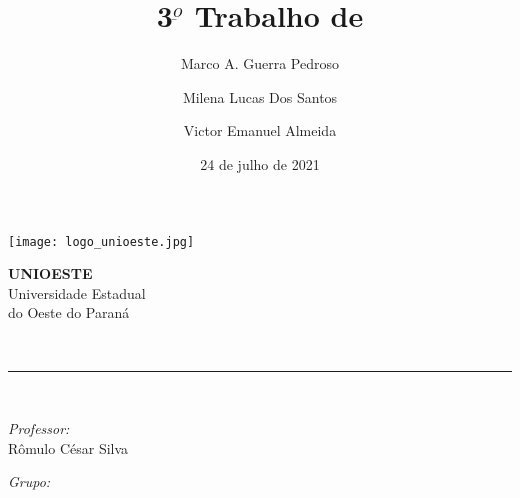 \documentclass[12pt, a4paper]{article}
\author{Marco A. Guerra Pedroso\and Milena Lucas Dos Santos\and Victor Emanuel Almeida}
\title{3$^{\underbar{o}}$ Trabalho de \materia}
\date{24 de julho de 2021}
\newcommand{\prof}{Rômulo César Silva}
\begin{document}
\begin{titlepage}
    \centering
    \thispagestyle{fancy}

    \begin{minipage}{0.4\textwidth}
        \begin{flushleft}
            \texttt{[image: logo\_unioeste.jpg]}\\[1.0 cm]
        \end{flushleft}
    \end{minipage}
    \begin{minipage}{0.5\textwidth}
        \begin{flushright}\large
            \textsc{\LARGE\textbf{UNIOESTE}}\\
            \vspace{1cm}
            Universidade Estadual\\do Oeste do Paraná
        \end{flushright}
    \end{minipage}
    \vspace*{4.5 cm}

    {\huge\bfseries\thetitle}\\
    \rule{\linewidth}{0.2 mm}\\[1.5 cm]

    \vspace{2cm}
    \begin{minipage}[t]{0.4\textwidth}
        \begin{flushleft}\large
            \emph{Professor:}\\
            \prof\\
        \end{flushleft}
    \end{minipage}
    \begin{minipage}[t]{0.5\textwidth}

        \begin{flushright}\large
            \emph{Grupo:}\\
            \theauthor
        \end{flushright}

    \end{minipage}\\[2 cm]

    \vfill\thedate
\end{titlepage}

\pagestyle{fancy}
\fancyfoot[L]{}
\fancyhead[L]{}
\fancyhead[R]{}
\end{document}
